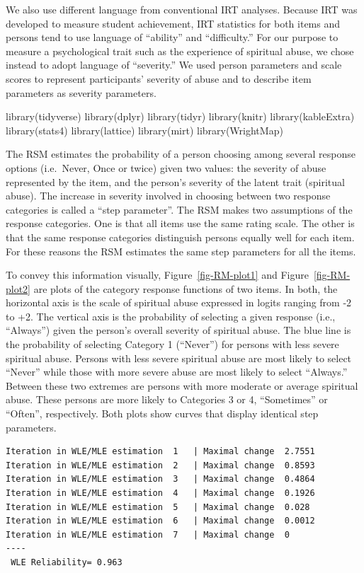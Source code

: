 \documentclass[
  letterpaper,
]{article}
\begin{document}
We also use different language from conventional IRT analyses. Because
IRT was developed to measure student achievement, IRT statistics for
both items and persons tend to use language of ``ability'' and
``difficulty.'' For our purpose to measure a psychological trait such as
the experience of spiritual abuse, we chose instead to adopt language of
``severity.'' We used person parameters and scale scores to represent
participants' severity of abuse and to describe item parameters as
severity parameters.

library(tidyverse) library(dplyr) library(tidyr) library(knitr)
library(kableExtra) library(stats4) library(lattice) library(mirt)
library(WrightMap)

The RSM estimates the probability of a person choosing among several
response options (i.e.~Never, Once or twice) given two values: the
severity of abuse represented by the item, and the person's severity of
the latent trait (spiritual abuse). The increase in severity involved in
choosing between two response categories is called a ``step parameter''.
The RSM makes two assumptions of the response categories. One is that
all items use the same rating scale. The other is that the same response
categories distinguish persons equally well for each item. For these
reasons the RSM estimates the same step parameters for all the items.

To convey this information visually, Figure~\ref{fig-RM-plot1} and
Figure~\ref{fig-RM-plot2} are plots of the category response functions
of two items. In both, the horizontal axis is the scale of spiritual
abuse expressed in logits ranging from -2 to +2. The vertical axis is
the probability of selecting a given response (i.e., ``Always'') given
the person's overall severity of spiritual abuse. The blue line is the
probability of selecting Category 1 (``Never'') for persons with less
severe spiritual abuse. Persons with less severe spiritual abuse are
most likely to select ``Never'' while those with more severe abuse are
most likely to select ``Always.'' Between these two extremes are persons
with more moderate or average spiritual abuse. These persons are more
likely to Categories 3 or 4, ``Sometimes'' or ``Often'', respectively.
Both plots show curves that display identical step parameters.

\begin{verbatim}
Iteration in WLE/MLE estimation  1   | Maximal change  2.7551 
Iteration in WLE/MLE estimation  2   | Maximal change  0.8593 
Iteration in WLE/MLE estimation  3   | Maximal change  0.4864 
Iteration in WLE/MLE estimation  4   | Maximal change  0.1926 
Iteration in WLE/MLE estimation  5   | Maximal change  0.028 
Iteration in WLE/MLE estimation  6   | Maximal change  0.0012 
Iteration in WLE/MLE estimation  7   | Maximal change  0 
----
 WLE Reliability= 0.963 
\end{verbatim}
\end{document}
